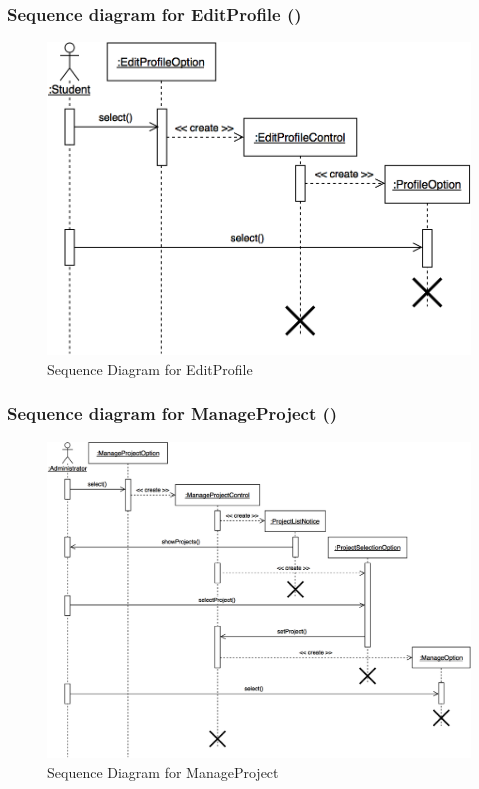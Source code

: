 \documentclass[12pt,letterpaper]{article}
\begin{document}
\subsubsection*{Sequence diagram for EditProfile (\editprofile{})}

\begin{figure}[H]
	\centering{}
	\includegraphics[scale=0.4]{imgs/seq/edit-profile.png}
	\caption{Sequence Diagram for EditProfile}
\end{figure}

\subsubsection*{Sequence diagram for ManageProject (\manageproject{})}

\begin{figure}[H]
	\centering{}
	\includegraphics[scale=0.3]{imgs/seq/manage-project.png}
	\caption{Sequence Diagram for ManageProject}
\end{figure}
\end{document}
